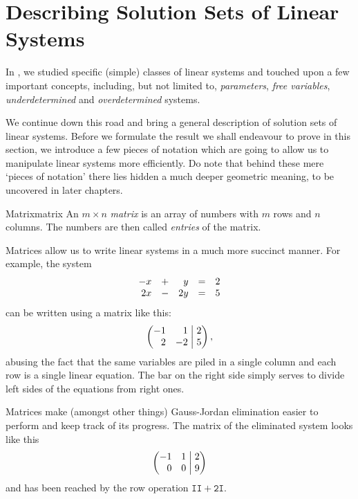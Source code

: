 \section{Describing Solution Sets of Linear Systems}
\label{sec:describing-solution-sets-of-linear-systems}

In , we studied specific (simple)
classes of linear systems and touched upon a few important concepts, including,
but not limited to, \emph{parameters}, \emph{free variables},
\emph{underdetermined} and \emph{overdetermined} systems.

We continue down this road and bring a general description of solution sets of
linear systems. Before we formulate the result we shall endeavour to prove in
this section, we introduce a few pieces of notation which are going to allow us
to manipulate linear systems more efficiently. Do note that behind these mere
`pieces of notation' there lies hidden a much deeper geometric meaning, to be
uncovered in later chapters.

\begin{definition}{Matrix}{matrix}
 An $m \times n$ \emph{matrix} is an array of numbers with $m$ rows and $n$
 columns. The numbers are then called \emph{entries} of the matrix.
\end{definition}

Matrices allow us to write linear systems in a much more succinct manner. For
example, the system
\[
 \begin{array}{r c r c r}
  -x & + & y & = & 2\\
  2x & - & 2y & = & 5
 \end{array}
\]
can be written using a matrix like this:
\[
 \left(
  \begin{matrix*}[r]
   -1 & 1\\
   2 & -2
  \end{matrix*}
  \hspace{1mm}
 \right|
 \left.
  \begin{matrix*}[r]
   2\\
   5
  \end{matrix*}
 \right),
\]
abusing the fact that the same variables are piled in a single column and each
row is a single linear equation. The bar on the right side simply serves to
divide left sides of the equations from right ones.

Matrices make (amongst other things) Gauss-Jordan elimination easier to perform
and keep track of its progress. The matrix of the eliminated system looks like
this
\[
 \left(
  \begin{matrix*}[r]
   -1 & 1\\
   0 & 0
  \end{matrix*}
  \hspace{1mm}
 \right|
 \left.
  \begin{matrix*}[r]
   2\\
   9
  \end{matrix*}
 \right)
\]
and has been reached by the row operation $\mathtt{II + 2I}$.


